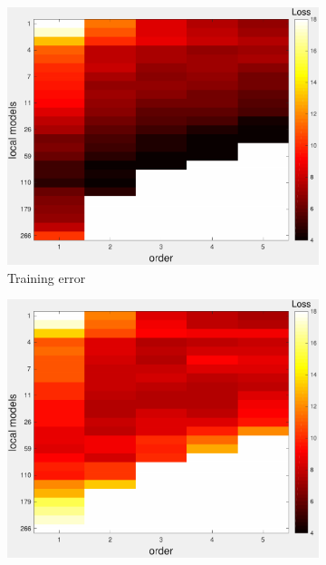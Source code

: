 \documentclass[letterpaper, 10 pt, conference]{ieeeconf}  %
\begin{document}
 \begin{figure}[htpb]
        \centering
        \begin{subfigure}[b]{1in} 
                \centering
                \includegraphics[width=\textwidth]{figures/cross_allreg1.pdf}
                \caption{Training error}
                \label{fig:crossval_train}
        \end{subfigure}
                \begin{subfigure}[b]{1in} 
                \centering
                \includegraphics[width=\textwidth]{figures/cross_allreg2.pdf}

\end{subfigure}
\end{figure}
\end{document}
